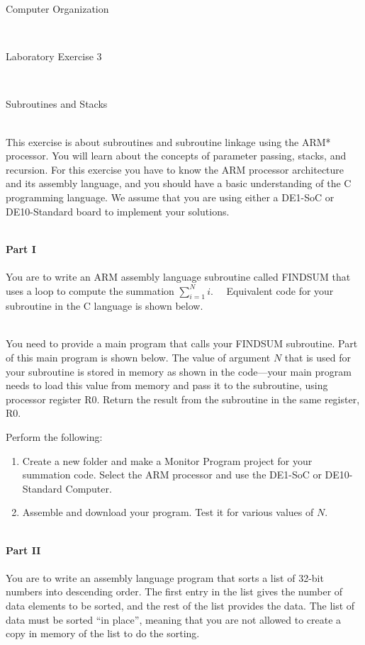 \documentclass[epsfig,10pt,fullpage]{article}
\newcommand{\LabNum}{3}
\begin{document}
\centerline{\huge Computer Organization}
~\\
\centerline{\huge Laboratory Exercise \LabNum}
~\\
\centerline{\large Subroutines and Stacks}
~\\

\noindent
This exercise is about subroutines and subroutine linkage using the ARM* processor.  You will 
learn about the concepts of parameter passing, stacks, and recursion.  For this 
exercise you have to know the ARM processor architecture and its assembly language, and 
you should have a basic understanding of the C programming language. We assume that you
are using either a DE1-SoC or DE10-Standard board to implement your solutions.

~\\
\noindent
{\bf Part I}
~\\
~\\
\noindent
You are to write an ARM assembly language subroutine called FINDSUM that uses a loop to 
compute the summation
$\displaystyle\sum_{i=1}^{N} i$.
~~Equivalent code for your subroutine in the C language is shown below. 


~\\
\noindent
You need to provide a main program that calls your FINDSUM subroutine.
Part of this main program is shown below.
The value of argument $N$ that is used for your subroutine is stored
in memory as shown in the code---your main program needs to load this value from memory and pass 
it to the subroutine, using processor register R0. Return the result from the subroutine
in the same register, R0.


\newpage
Perform the following:

\begin{enumerate}
\item
Create a new folder and make a Monitor Program project for your summation code. Select
the ARM processor and use the DE1-SoC  or DE10-Standard Computer. 

\item
Assemble and download your program.  Test it for various values of $N$.
\end{enumerate}

~\\
\noindent
{\bf Part II}
~\\
~\\
\noindent
You are to write an assembly language program that sorts a list of 32-bit numbers 
into descending order.  The first entry in the list gives the number of data elements to 
be sorted, and the rest of the list provides the data. The list of data must be 
sorted ``in place'', meaning that you are not allowed to create a copy in memory of the 
list to do the sorting.  
\end{document}

